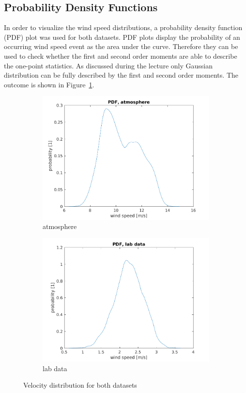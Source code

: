 \documentclass[12pt]{article}
\begin{document}
\subsection{Probability Density Functions}
In order to visualize the wind speed distributions, a probability density function (PDF) plot was used for both datasets. PDF plots display the probability of an occurring wind speed event as the area under the curve. Therefore they can be used to check whether the first and second order moments are able to describe the one-point statistics. As discussed during the lecture only Gaussian distribution can be fully described by the first and second order moments. The outcome is shown in Figure~\ref{fig:pdf_u_both}.
\begin{figure}[H]
\begin{subfigure}{0.5\textwidth}
  \centering
  \includegraphics[width=1\linewidth]{figures/pdf_u_atmo.png}
  \caption{atmosphere}
\end{subfigure}
\begin{subfigure}{0.5\textwidth}
  \centering
  \includegraphics[width=1\linewidth]{figures/pdf_u_center.png}
  \caption{lab data}
\end{subfigure}
\caption{Velocity distribution for both datasets}
\label{fig:pdf_u_both}
\end{figure}
\end{document}
